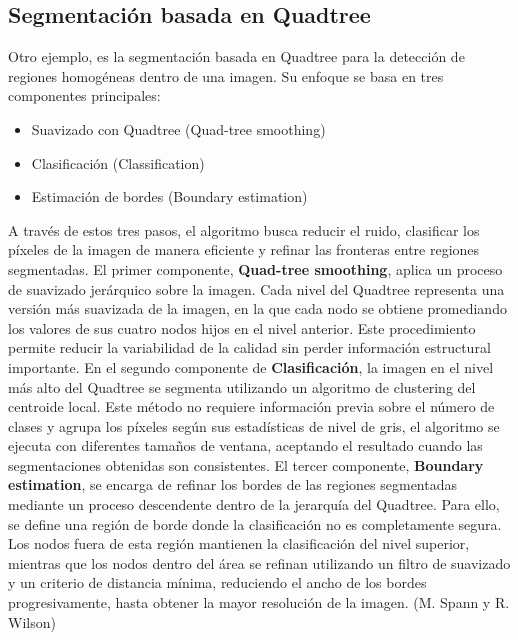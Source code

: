 \documentclass[9pt,a4paper,twoside]{rho-class/rho}
\begin{document}
        \subsection{Segmentación basada en Quadtree}
            Otro ejemplo, es la segmentación basada en Quadtree para la detección de regiones homogéneas dentro de una imagen. Su enfoque se basa en tres componentes principales:
            \begin{itemize}
                \item Suavizado con Quadtree (Quad-tree smoothing)
                \item Clasificación (Classification)
                \item Estimación de bordes (Boundary estimation)
            \end{itemize}
            A través de estos tres pasos, el algoritmo busca reducir el ruido, clasificar los píxeles de la imagen de manera eficiente y refinar las fronteras entre regiones segmentadas.
            El primer componente, \textbf{Quad-tree smoothing}, aplica un proceso de suavizado jerárquico sobre la imagen. Cada nivel del Quadtree representa una versión más suavizada de la imagen, en la que cada nodo se obtiene promediando los valores de sus cuatro nodos hijos en el nivel anterior. Este procedimiento permite reducir la variabilidad de la calidad sin perder información estructural importante.
            En el segundo componente de \textbf{Clasificación}, la imagen en el nivel más alto del Quadtree se segmenta utilizando un algoritmo de clustering del centroide local. Este método no requiere información previa sobre el número de clases y agrupa los píxeles según sus estadísticas de nivel de gris, el algoritmo se ejecuta con diferentes tamaños de ventana, aceptando el resultado cuando las segmentaciones obtenidas son consistentes.
            El tercer componente, \textbf{Boundary estimation}, se encarga de refinar los bordes de las regiones segmentadas mediante un proceso descendente dentro de la jerarquía del Quadtree. Para ello, se define una región de borde donde la clasificación no es completamente segura. Los nodos fuera de esta región mantienen la clasificación del nivel superior, mientras que los nodos dentro del área se refinan utilizando un filtro de suavizado y un criterio de distancia mínima, reduciendo el ancho de los bordes progresivamente, hasta obtener la mayor resolución de la imagen. (M. Spann y R. Wilson)
\end{document}
